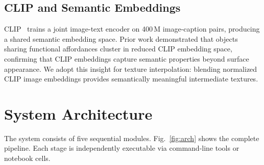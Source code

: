 \documentclass[conference]{IEEEtran}
\begin{document}
\subsection{CLIP and Semantic Embeddings}

CLIP~\cite{b10} trains a joint image-text encoder on 400\,M image-caption
pairs, producing a shared semantic embedding space. Prior work \cite{b16}
demonstrated that objects sharing functional affordances cluster in
reduced CLIP embedding space, confirming that CLIP embeddings capture
semantic properties beyond surface appearance. We adopt this insight for
texture interpolation: blending normalized CLIP image embeddings
provides semantically meaningful intermediate textures.

\section{System Architecture}

The system consists of five sequential modules. Fig.~\ref{fig:arch} shows
the complete pipeline. Each stage is independently executable via command-line
tools or notebook cells.
\end{document}
